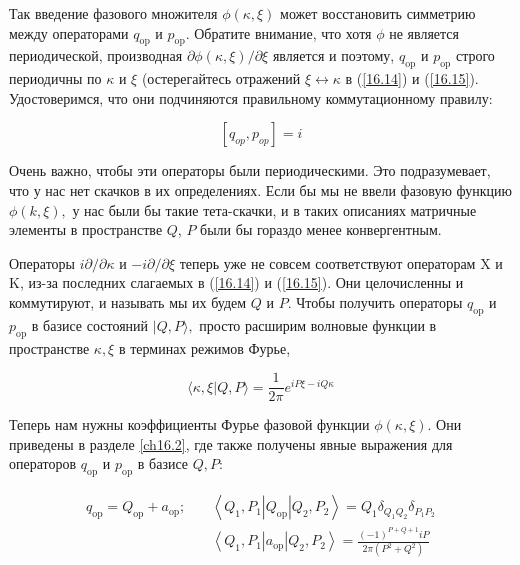 \documentclass[main.tex]{subfiles}
\begin{document}
Так введение фазового множителя $\phi(\kappa, \xi)$ может восстановить симметрию между операторами $q_{\mathrm{op}}$ и $p_{\mathrm{op}}$. Обратите внимание, что хотя $\phi$ не является периодической, производная $\partial\phi(\kappa,\xi)/\partial\xi$ является и поэтому, $q_{\mathrm{op}}$ и $p_{\mathrm{op}}$ строго периодичны по $\kappa$
и $\xi$ (остерегайтесь отражений $\xi \leftrightarrow \kappa$ в  (\ref{16.14}) и (\ref{16.15}).
Удостоверимся, что они подчиняются правильному коммутационному правилу:

\begin{equation}\label{16.16}
[q_{op},p_{op}] = i
\end{equation}

Очень важно, чтобы эти операторы были периодическими. Это подразумевает, что у нас нет скачков в их определениях. Если бы мы не ввели фазовую функцию $\phi(k, \xi),$ у нас были бы такие тета-скачки, и в таких описаниях матричные элементы в пространстве $Q$, $P$ были бы гораздо менее конвергентным.

Операторы $i \partial / \partial \kappa$ и $-i \partial / \partial \xi$ теперь уже не совсем соответствуют операторам $\mathrm{X}$ и $\mathrm{K}$, из-за последних слагаемых в (\ref{16.14}) и (\ref{16.15}). Они целочисленны и коммутируют, и называть мы их будем $Q$ и $P$. Чтобы получить операторы $q_{\mathrm{op}}$ и $p_{\mathrm{op}}$ в базисе состояний $|Q, P\rangle,$ просто расширим волновые функции в пространстве $\kappa, \xi$ в терминах режимов Фурье,

\begin{equation}\label{16.17}
	\langle\kappa, \xi | Q, P\rangle=\frac{1}{2 \pi} e^{i P \xi-i Q \kappa}
\end{equation}

Теперь нам нужны коэффициенты Фурье фазовой функции $\phi(\kappa, \xi)$. Они приведены в разделе \ref{ch16.2}, где также получены явные выражения для операторов $q_{\mathrm{op}}$ и $p_{\mathrm{op}}$ в базисе $Q, P$:

\begin{equation}\label{16.18} 
\begin{aligned}
q_{\mathrm{op}}=Q_{\mathrm{op}}+a_{\mathrm{op}} ; \quad &\left\langle Q_{1}, P_{1}\left|Q_{\mathrm{op}}\right| Q_{2}, P_{2}\right\rangle= Q_{1} \delta_{Q_{1} Q_{2}} \delta_{P_{1} P_{2}} \\
&\left\langle Q_{1}, P_{1}\left|a_{\mathrm{op}}\right| Q_{2}, P_{2}\right\rangle=\frac{(-1)^{P+Q+1} i P}{2 \pi\left(P^{2}+Q^{2}\right)}
\end{aligned}
\end{equation}
\end{document}
